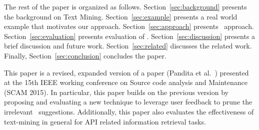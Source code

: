 The rest of the paper is organized as follows.
Section~\ref{sec:background} presents the background on Text Mining.
Section~\ref{sec:example} presents a real world example that motivates our approach. Section~\ref{sec:approach} presents \tool\ approach.
Section~\ref{sec:evaluation} presents evaluation of \tool.
Section~\ref{sec:discussion} presents a brief discussion and future work.
Section~\ref{sec:related} discusses the related work.
Finally, Section~\ref{sec:conclusion} concludes the paper.


\begin{framed}
This paper is a revised, expanded version of a paper (Pandita et al.~\cite{pandita2015discovering}) presented at the 15th
IEEE working conference on Source code analysis and Maintenance (SCAM 2015).
In particular, this paper builds on the previous version by proposing and evaluating a new technique to leverage user feedback to prune the irrelevant \tool\ suggestions. Additionally, this paper also evaluates the effectiveness of text-mining in general for API related information retrieval tasks.
\end{framed}


